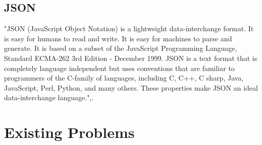 \documentclass[12pt]{article}
\begin{document}
\subsection{JSON}
"JSON (JavaScript Object Notation) is a lightweight data-interchange format. It is easy for humans to read and write. It is easy for machines to parse and generate. It is based on a subset of the JavaScript Programming Language, Standard ECMA-262 3rd Edition - December 1999. JSON is a text format that is completely language independent but uses conventions that are familiar to programmers of the C-family of languages, including C, C++, C sharp, Java, JavaScript, Perl, Python, and many others. These properties make JSON an ideal data-interchange language.",\cite{json}.

\section{Existing Problems}
\end{document}
